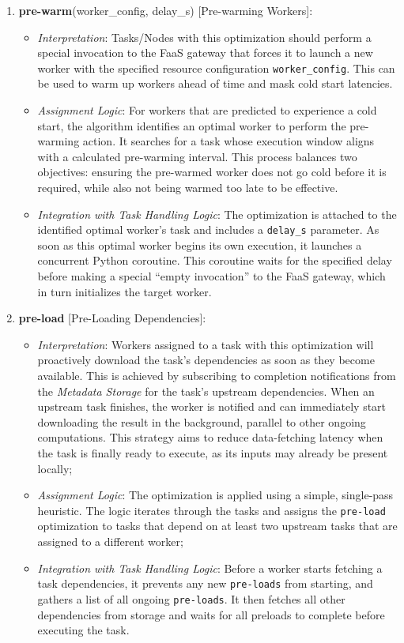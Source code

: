 \begin{enumerate}
\item\textbf{pre-warm}(worker\_config, delay\_s) [Pre-warming Workers]:
\begin{itemize}
\item \textit{Interpretation}: Tasks/Nodes with this optimization should perform a special invocation to the FaaS gateway that forces it to launch a new worker with the specified resource configuration \texttt{worker\_config}. This can be used to warm up workers ahead of time and mask cold start latencies.
\item \textit{Assignment Logic}: For workers that are predicted to experience a cold start, the algorithm identifies an optimal worker to perform the pre-warming action. It searches for a task whose execution window aligns with a calculated pre-warming interval. This process balances two objectives: ensuring the pre-warmed worker does not go cold before it is required, while also not being warmed too late to be effective.
\item \textit{Integration with Task Handling Logic}: The optimization is attached to the identified optimal worker's task and includes a \texttt{delay\_s} parameter. As soon as this optimal worker begins its own execution, it launches a concurrent Python coroutine. This coroutine waits for the specified delay before making a special “empty invocation” to the FaaS gateway, which in turn initializes the target worker.
\end{itemize}

\item\textbf{pre-load} [Pre-Loading Dependencies]:
\begin{itemize}
\item \textit{Interpretation}: Workers assigned to a task with this optimization will proactively download the task's dependencies as soon as they become available. This is achieved by subscribing to completion notifications from the \textit{Metadata Storage} for the task's upstream dependencies. When an upstream task finishes, the worker is notified and can immediately start downloading the result in the background, parallel to other ongoing computations. This strategy aims to reduce data-fetching latency when the task is finally ready to execute, as its inputs may already be present locally;
\item \textit{Assignment Logic}: The optimization is applied using a simple, single-pass heuristic. The logic iterates through the tasks and assigns the \texttt{pre-load} optimization to tasks that depend on at least two upstream tasks that are assigned to a different worker;
\item \textit{Integration with Task Handling Logic}: Before a worker starts fetching a task dependencies, it prevents any new \texttt{pre-loads} from starting, and gathers a list of all ongoing \texttt{pre-loads}. It then fetches all other dependencies from storage and waits for all preloads to complete before executing the task.
\end{itemize}
\end{enumerate}

